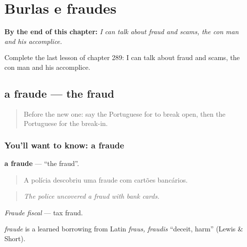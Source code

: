 
\chapter{Burlas e fraudes}
\label{ch:pt-burlas-e-fraudes}

\begin{chapteropening}
\textbf{By the end of this chapter:} \emph{I can talk about fraud and scams, the con man and his accomplice.}

Complete the last lesson of chapter 289: I can talk about fraud and scams, the con man and his accomplice.
\end{chapteropening}

\section[a fraude]{a fraude — the fraud}

\label{lesson:PT-C289-fraude}



\begin{quote}
Before the new one: say the Portuguese for to break open, then the Portuguese for the break-in.
\end{quote}

\subsection*{You'll want to know: a fraude}
\textbf{a fraude} — \textquotedblleft{}the fraud\textquotedblright{}.

\begin{quote}
A polícia descobriu uma fraude com cartões bancários.
\end{quote}

\begin{quote}
\emph{The police uncovered a fraud with bank cards.}
\end{quote}

\emph{Fraude fiscal} — tax fraud.

\begin{cousinweb}
\emph{fraude} is a learned borrowing from Latin \emph{fraus, fraudis} \textquotedblleft{}deceit, harm\textquotedblright{} (Lewis \& Short).
\end{cousinweb}

